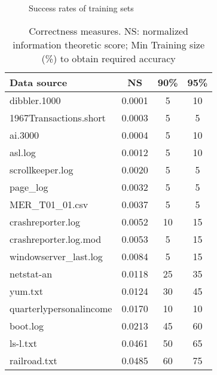 \begin{figure}
\caption{Success rates of training sets} \label{fig:trainsucc}
\end{figure}

\begin{table}
\begin{center}
\begin{tabular}{|l||c|c|c|} \hline
Data source		  & NS  			& 90\% 		& 95\% \\ \hline \hline
dibbler.1000            & 0.0001		& 5		& 10 \\ \hline
1967Transactions.short	& 0.0003		& 5		& 5 \\ \hline
ai.3000                 & 0.0004		& 5		& 10 \\ \hline
asl.log                 & 0.0012		& 5		& 10\\ \hline
scrollkeeper.log        & 0.0020		& 5		& 5\\ \hline
page\_log               & 0.0032		& 5		& 5\\ \hline
MER\_T01\_01.csv        & 0.0037		& 5		& 5 \\ \hline
crashreporter.log       & 0.0052		& 10		& 15\\ \hline
crashreporter.log.mod   & 0.0053		& 5		& 15\\ \hline
windowserver\_last.log  & 0.0084		& 5		& 15\\ \hline
netstat-an              & 0.0118		& 25		& 35\\ \hline
yum.txt                 & 0.0124		& 30		& 45\\ \hline
quarterlypersonalincome & 0.0170		& 10		& 10\\ \hline
boot.log                & 0.0213		& 45		& 60\\ \hline
ls-l.txt                & 0.0461		& 50		& 65 \\ \hline
railroad.txt            & 0.0485		& 60		& 75\\ \hline
\end{tabular}
\caption{Correctness measures.  NS: normalized information theoretic score;
Min Training size (\%) to obtain required accuracy}
\label{tab:correlate}
\end{center}
\end{table}



